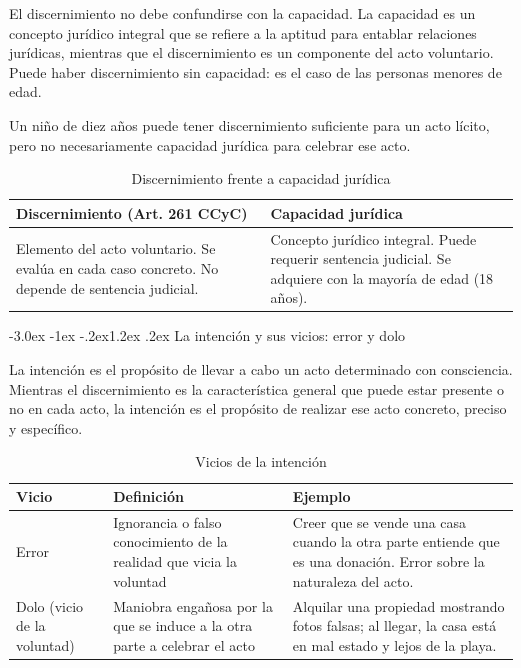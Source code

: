 \documentclass[12pt,oneside]{book}
\makeatletter
\renewcommand\section{\@startsection{section}{1}{\z@}%
  {-3.0ex \@plus -1ex \@minus -.2ex}{1.2ex \@plus .2ex}%
  {\normalfont\large\bfseries\color{acento}}}
\makeatother
\begin{document}
\begin{importante}
El discernimiento no debe confundirse con la capacidad. La capacidad es un concepto jurídico integral que se refiere a la aptitud para entablar relaciones jurídicas, mientras que el discernimiento es un componente del acto voluntario. Puede haber discernimiento sin capacidad: es el caso de las personas menores de edad.
\end{importante}

\begin{ejemplo}
Un niño de diez años puede tener discernimiento suficiente para un acto lícito, pero no necesariamente capacidad jurídica para celebrar ese acto.
\end{ejemplo}

\begin{table}[H]
\centering
\caption{Discernimiento frente a capacidad jurídica}
\begin{tabularx}{\textwidth}{X X}
\toprule
\textbf{Discernimiento (Art. 261 CCyC)} & \textbf{Capacidad jurídica} \\
\midrule
Elemento del acto voluntario. Se evalúa en cada caso concreto. No depende de sentencia judicial. & Concepto jurídico integral. Puede requerir sentencia judicial. Se adquiere con la mayoría de edad (18 años). \\
\bottomrule
\end{tabularx}
\end{table}

\section{La intención y sus vicios: error y dolo}

La intención es el propósito de llevar a cabo un acto determinado con consciencia. Mientras el discernimiento es la característica general que puede estar presente o no en cada acto, la intención es el propósito de realizar ese acto concreto, preciso y específico.

\begin{table}[H]
\centering
\caption{Vicios de la intención}
\begin{tabularx}{\textwidth}{l X X}
\toprule
\textbf{Vicio} & \textbf{Definición} & \textbf{Ejemplo} \\
\midrule
Error & Ignorancia o falso conocimiento de la realidad que vicia la voluntad & Creer que se vende una casa cuando la otra parte entiende que es una donación. Error sobre la naturaleza del acto. \\
Dolo (vicio de la voluntad) & Maniobra engañosa por la que se induce a la otra parte a celebrar el acto & Alquilar una propiedad mostrando fotos falsas; al llegar, la casa está en mal estado y lejos de la playa. \\
\bottomrule
\end{tabularx}
\end{table}
\end{document}
